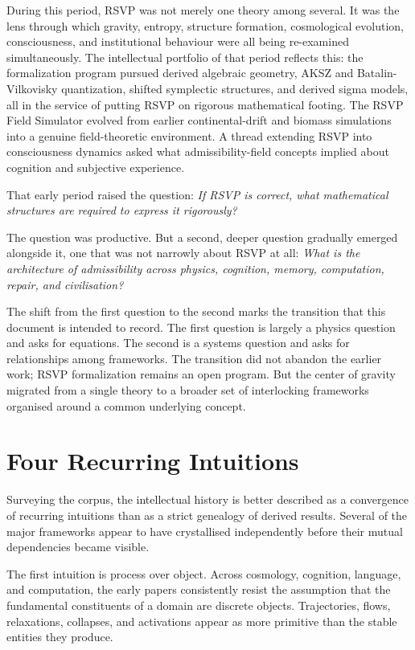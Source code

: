 \documentclass[12pt, twoside]{article}
\begin{document}
During this period, RSVP was not merely one theory among several. It was the
lens through which gravity, entropy, structure formation, cosmological
evolution, consciousness, and institutional behaviour were all being
re-examined simultaneously. The intellectual portfolio of that period
reflects this: the formalization program pursued derived algebraic geometry,
AKSZ and Batalin-Vilkovisky quantization, shifted symplectic structures, and
derived sigma models, all in the service of putting RSVP on rigorous
mathematical footing. The RSVP Field Simulator evolved from earlier
continental-drift and biomass simulations into a genuine field-theoretic
environment. A thread extending RSVP into consciousness dynamics asked what
admissibility-field concepts implied about cognition and subjective
experience.

That early period raised the question: \emph{If RSVP is correct, what
mathematical structures are required to express it rigorously?}

The question was productive. But a second, deeper question gradually emerged
alongside it, one that was not narrowly about RSVP at all: \emph{What is the
architecture of admissibility across physics, cognition, memory, computation,
repair, and civilisation?}

The shift from the first question to the second marks the transition that
this document is intended to record. The first question is largely a physics
question and asks for equations. The second is a systems question and asks
for relationships among frameworks. The transition did not abandon the
earlier work; RSVP formalization remains an open program. But the center of
gravity migrated from a single theory to a broader set of interlocking
frameworks organised around a common underlying concept.

\section{Four Recurring Intuitions}

Surveying the corpus, the intellectual history is better described as a
convergence of recurring intuitions than as a strict genealogy of derived
results. Several of the major frameworks appear to have crystallised
independently before their mutual dependencies became visible.

The first intuition is process over object. Across cosmology, cognition,
language, and computation, the early papers consistently resist the
assumption that the fundamental constituents of a domain are discrete
objects. Trajectories, flows, relaxations, collapses, and activations appear
as more primitive than the stable entities they produce.
\end{document}
